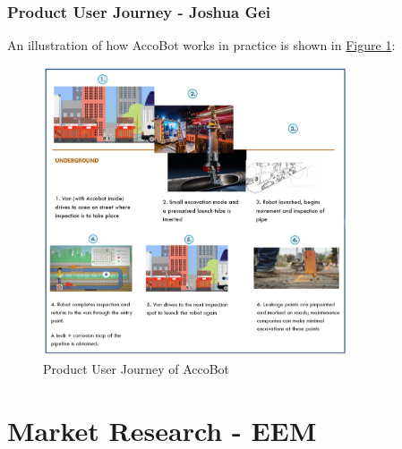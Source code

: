 \documentclass[11pt]{article}		%
\newcommand{\figref}[1]{\hyperref[#1]{Figure \ref*{#1}}}    %
\begin{document}
			\subsubsection[Product User Journey]{Product User Journey - Joshua Gei} \label{userJourney}
	An illustration of how AccoBot works in practice is shown in \figref{userjourney}:
	\begin{figure}[h]
				\centering
				\includegraphics[width=0.8\textwidth]{userjourneyfull.jpg}
				\caption{Product User Journey of AccoBot}
				\label{userjourney}
			\end{figure}
	
	
	

    \section{Market Research - EEM}
        
\end{document}
